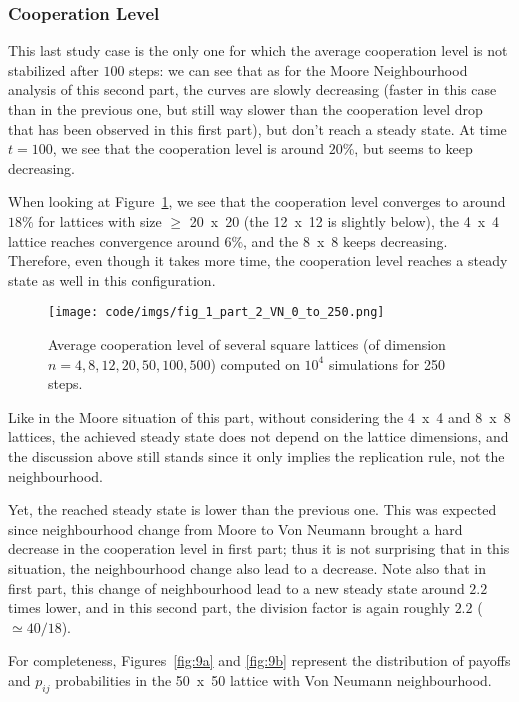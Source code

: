 \documentclass{article}
\begin{document}
\subsubsection{Cooperation Level}

This last study case is the only one for which the average cooperation level is not stabilized after $100$ steps:
we can see that as for the Moore Neighbourhood analysis of this second part, the curves are slowly decreasing
(faster in this case than in the previous one, but still way slower than the cooperation level drop that has
been observed in this first part), but don't reach a steady state. At time $t=100$, we see that the cooperation
level is around $20\%$, but seems to keep decreasing.

When looking at Figure~\ref{fig:replot of fig 1}, we see that the cooperation level converges to around $18\%$
for lattices with size $\geq$ 20~x~20 (the 12~x~12 is slightly below), the 4~x~4 lattice reaches convergence
around $6\%$, and the 8~x~8 keeps decreasing. Therefore, even though it takes more time, the cooperation level
reaches a steady state as well in this configuration.

\begin{figure}[!t]
\hspace{-1.8cm}
\texttt{[image: code/imgs/fig\_1\_part\_2\_VN\_0\_to\_250.png]}
\caption{Average cooperation level of several square lattices (of dimension $n=4,8,12,20,50,100,500$) computed
on $10^4$ simulations for 250 steps.\label{fig:replot of fig 1}}
\end{figure}

Like in the Moore situation of this part, without considering the 4~x~4 and 8~x~8 lattices, the achieved
steady state does not depend on the lattice dimensions, and the discussion above still stands since it only
implies the replication rule, not the neighbourhood.

Yet, the reached steady state is lower than the previous one. This was expected since neighbourhood change
from Moore to Von Neumann brought a hard decrease in the cooperation level in first part; thus it is not
surprising that in this situation, the neighbourhood change also lead to a decrease. Note also that in first
part, this change of neighbourhood lead to a new steady state around $2.2$ times lower, and in this second
part, the division factor is again roughly $2.2$ ($\simeq 40/18$).

For completeness, Figures~\ref{fig:9a} and \ref{fig:9b} represent the distribution of payoffs and $p_{ij}$
probabilities in the 50~x~50 lattice with Von Neumann neighbourhood.
\end{document}
